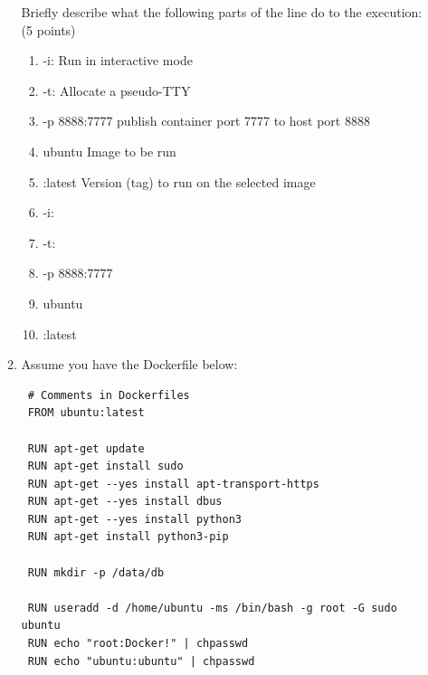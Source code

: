 \documentclass[10pt]{article}
\begin{document}
\begin{enumerate}
\begin{enumerate}
	Briefly describe what the following parts of the line do to the execution: (5 points)
	\begin{enumerate}
	\beginanswers
		\item -i:
		Run in interactive mode
		\bigskip
		\item -t:
		Allocate a pseudo-TTY
		\bigskip
		\item -p 8888:7777
		publish container port 7777 to host port 8888  
		\bigskip
		\item ubuntu
        Image to be run
		\bigskip
		\item :latest
		Version (tag) to run on the selected image
		\bigskip		
	\else	
		\item -i:
		\bigskip
		\bigskip
		\item -t:
        \bigskip
        \bigskip
		\item -p 8888:7777
        \bigskip
        \bigskip
        \item ubuntu
        \bigskip
        \bigskip
        \item :latest
        \bigskip
        \bigskip		
	\fi
    \end{enumerate}
 \item Assume you have the Dockerfile below:
 \begin{verbatim}
 # Comments in Dockerfiles
 FROM ubuntu:latest
 
 RUN apt-get update
 RUN apt-get install sudo
 RUN apt-get --yes install apt-transport-https
 RUN apt-get --yes install dbus
 RUN apt-get --yes install python3
 RUN apt-get install python3-pip
 
 RUN mkdir -p /data/db
 
 RUN useradd -d /home/ubuntu -ms /bin/bash -g root -G sudo ubuntu
 RUN echo "root:Docker!" | chpasswd
 RUN echo "ubuntu:ubuntu" | chpasswd
 

\end{verbatim}
\end{enumerate}
\end{enumerate}
\end{document}
